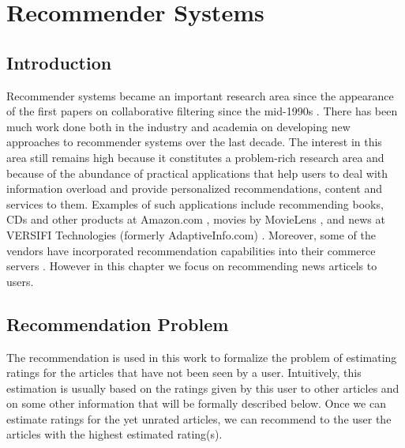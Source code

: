 
\chapter{Recommender Systems} %

\label{recommender} %


\section{Introduction}
Recommender systems became an important research area since the appearance of the first papers on collaborative filtering since the mid-1990s  \citep{recom_45} \citep{recom_86} \citep{recom_97}. There has been much work done both in the industry and academia on developing new approaches to recommender systems over the last decade. The interest in this area still remains high because it constitutes a problem-rich research area and because of the abundance of practical applications that help users to deal with information overload and provide personalized recommendations, content and services to them. Examples of such applications include recommending books, CDs and other products at Amazon.com \citep{recom_61}, movies by MovieLens \citep{recom_67}, and news at VERSIFI Technologies (formerly AdaptiveInfo.com) \citep{recom_14}. Moreover, some of the vendors have incorporated recommendation capabilities into their commerce servers \citep{recom_78}. However in this chapter we focus on recommending news articels to users.


\section{Recommendation Problem}
The recommendation is used in this work to formalize the problem of estimating ratings for the articles that have not been seen by a user. Intuitively, this estimation is usually based on the ratings given by this user to other articles and on some other information that will be formally described below. Once we can estimate ratings for the yet unrated articles, we can recommend to the user the articles with the highest estimated rating(s).


